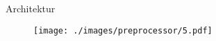 \begin{frame}{Architektur}
    \begin{figure}
    	\centering
    	\texttt{[image: ./images/preprocessor/5.pdf]}
    \end{figure}
\end{frame}
